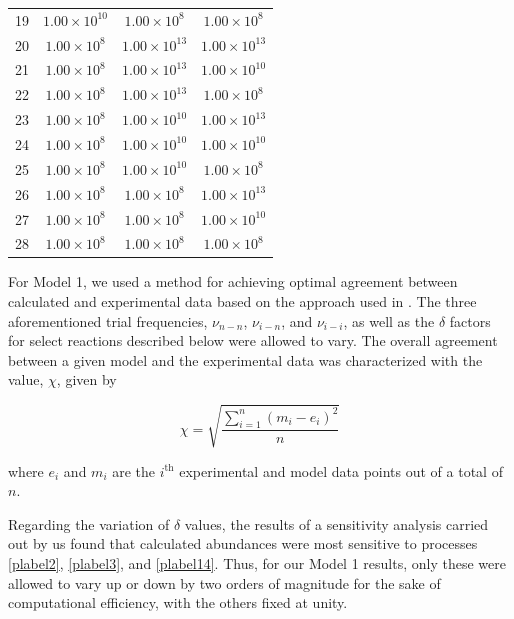 \documentclass[journal=aesccq,manuscript=article,layout=twocolumn]{achemso}
\begin{document}
\begin{table}[p!]
\begin{tabular}{cccc}
19 & \(1.00 \times 10^{10}\) & \(1.00 \times 10^{8}\) & \(1.00 \times 10^{8}\) \\
20 & \(1.00 \times 10^{8}\) & \(1.00 \times 10^{13}\) & \(1.00 \times 10^{13}\) \\
21 & \(1.00 \times 10^{8}\) & \(1.00 \times 10^{13}\) & \(1.00 \times 10^{10}\) \\
22 & \(1.00 \times 10^{8}\) & \(1.00 \times 10^{13}\) & \(1.00 \times 10^{8}\) \\
23 & \(1.00 \times 10^{8}\) & \(1.00 \times 10^{10}\) & \(1.00 \times 10^{13}\) \\
24 & \(1.00 \times 10^{8}\) & \(1.00 \times 10^{10}\) & \(1.00 \times 10^{10}\) \\
25 & \(1.00 \times 10^{8}\) & \(1.00 \times 10^{10}\) & \(1.00 \times 10^{8}\) \\
26 & \(1.00 \times 10^{8}\) & \(1.00 \times 10^{8}\) & \(1.00 \times 10^{13}\) \\
27 & \(1.00 \times 10^{8}\) & \(1.00 \times 10^{8}\) & \(1.00 \times 10^{10}\) \\
28 & \(1.00 \times 10^{8}\) & \(1.00 \times 10^{8}\) & \(1.00 \times 10^{8}\) \\
    \hline
  \end{tabular}
\end{table}

For Model 1, we used a method for achieving optimal agreement between calculated and experimental data based on the approach used in \citet{mullikin_new_2021}. The three aforementioned trial frequencies, $\nu_{n-n}$, $\nu_{i-n}$, and $\nu_{i-i}$, as well as the $\delta$ factors for select reactions described below were allowed to vary. The overall agreement between a given model and the experimental data was characterized with the value, $\chi$, given by

\begin{equation}
    \chi = \sqrt{\frac{\sum_{i=1}^{n} (m_i - e_i)^2}{n}}
\end{equation}

\noindent
where $e_i$ and $m_i$ are the $i^{\textrm{th}}$ experimental and model data points out of a total of $n$.

Regarding the variation of $\delta$ values, the results of a sensitivity analysis carried out by us found that calculated  abundances were most sensitive to processes \ref{plabel2}, \ref{plabel3}, and \ref{plabel14}. Thus, for our Model 1 results, only these were allowed to vary up or down by two orders of magnitude for the sake of computational efficiency, with the others fixed at unity. 
\end{document}
